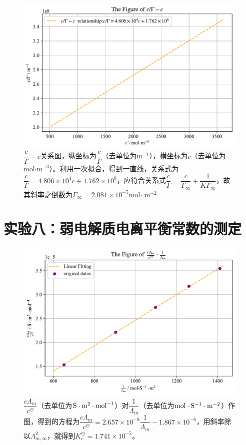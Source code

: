 \documentclass[UTF8,AutoFakeBold,a4paper]{article}
\begin{document}
\begin{figure}[h]
	\centering
	\includegraphics[scale=0.8]{Figure3}
	\caption{$\dfrac{c}{\varGamma}-c$关系图，纵坐标为$\dfrac{c}{\varGamma}$（去单位为m$^{-1}$），横坐标为$c$（去单位为 mol$\cdot $m$^{-3}$）。利用一次拟合，得到一直线，关系式为\textcolor[rgb]{0.54,0.13,0.33}{$\dfrac{c}{\varGamma} = 4.806 \times 10^{4}c + 1.762 \times 10^{8}$}，应符合关系式\textcolor[rgb]{0.07,0.36,0.57}{$\dfrac{c}{\varGamma} = \dfrac{c}{\varGamma_{\infty}}+\dfrac{1}{K\varGamma_{\infty}}$}，故其斜率之倒数为$\varGamma_{\infty} = 2.081 \times10^{-5}$mol$\cdot$ m$^{-2}$}
	\label{fi4}
\end{figure}
\newpage
\section{实验八：弱电解质电离平衡常数的测定}
\begin{figure}[h]
	\centering
	\includegraphics[scale=0.8]{Map}
	\caption{$\dfrac{c\varLambda_{m}}{c^{\ominus}} $（去单位为$\rm{S}\cdot\rm{m}^{2}\cdot\rm{mol}^{-1}$）对$ \dfrac{1}{\varLambda_{m}}$（去单位为$\rm{mol}\cdot\rm{S}^{-1}\cdot\rm{m}^{-2}$）作图，得到的方程为\textcolor[rgb]{0.54,0.13,0.33}{$\dfrac{c\varLambda_{m}}{c^{\ominus}} =2.657\times 10^{-8} \dfrac{1}{\varLambda_{m}}- 1.867\times 10^{-6}$}，用斜率除以$\varLambda_{m,\infty}^{2}$，就得到\textcolor[rgb]{0.54,0.13,0.33}{$K_{c}^{\ominus} = 1.741\times 10^{-5}$}。}
	\label{fi5}
\end{figure}
\newpage
\end{document}
